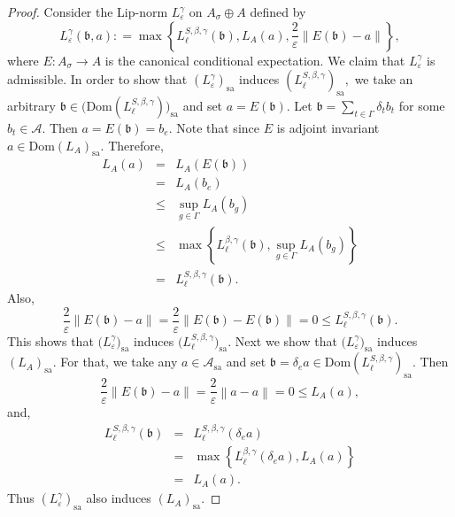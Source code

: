 \documentclass[a4paper,11pt,reqno]{amsart}
\theoremstyle{plain}
\theoremstyle{mainthmstyle}
\theoremstyle{named}
\numberwithin{equation}{section}
\newcommand{\Bea}{\begin{eqnarray*}}
\newcommand{\Eea}{\end{eqnarray*}}
\begin{document}
\begin{proof}
Consider the Lip-norm $L_{\varepsilon}^{\gamma}$ on $A_{\sigma} \oplus A$ defined by 
$$L_{\varepsilon}^{\gamma} (\mathfrak {b}, a) : = \max \left \{L_{\ell}^{S, \beta, \gamma} (\mathfrak {b}), L_A (a), \frac {2} {\varepsilon} \left \|E (\mathfrak {b}) - a \right \| \right \},$$
where $E : A_{\sigma} \rightarrow A$ is the canonical conditional expectation. We claim that $L_{\varepsilon}^{\gamma}$ is admissible. In order to show that $(L_{\varepsilon}^{\gamma})_{\mathrm{sa}}$ induces $(L_{\ell}^{S, \beta, \gamma})_{\mathrm{sa}},$ we take an arbitrary $\mathfrak {b} \in \big(\mathrm{Dom}(L^{S,\beta,\gamma}_{\ell})\big)_{\mathrm{sa}}$ and set $a = E (\mathfrak {b}).$ Let $\mathfrak {b} = \sum\limits_{t \in \Gamma} \delta_t b_t$ for some $b_{t}\in\mathcal A$. Then $a = E (\mathfrak {b}) = b_e.$ Note that since $E$ is adjoint invariant $a \in \mathrm{Dom}(L_A)_\mathrm{sa}.$ Therefore,
\Bea
L_A (a) & = & L_A (E (\mathfrak {b})) \\ & = & L_A \left (b_e \right ) \\ & \leq & \sup\limits_{g \in \Gamma} L_A \left (b_g \right ) \\ & \leq & \max \left \{L_{\ell}^{\beta, \gamma} (\mathfrak {b}), \sup\limits_{g \in \Gamma} L_A \left (b_g \right ) \right \} \\ & = & L_{\ell}^{S, \beta, \gamma} (\mathfrak {b}).
\Eea
Also, $$\frac {2} {\varepsilon} \left \|E (\mathfrak {b}) - a \right \| = \frac {2} {\varepsilon} \left \|E (\mathfrak {b}) - E (\mathfrak {b}) \right \| = 0 \leq L_{\ell}^{S, \beta, \gamma} (\mathfrak {b}).$$
This shows that $\big(L_{\varepsilon}^{\gamma}\big)_{\mathrm{sa}}$ induces $\big(L_{\ell}^{S, \beta, \gamma}\big)_{\mathrm{sa}}.$ Next we show that $\big(L_{\varepsilon}^{\gamma}\big)_{\mathrm{sa}}$ induces $(L_A)_{\mathrm{sa}}.$
For that, we take any $a \in \mathcal {A}_{\mathrm {sa}}$ and set $\mathfrak {b} = \delta_e a \in  \mathrm{Dom}(L^{S,\beta,\gamma}_{\ell})_{\mathrm {sa}}.$ Then 
$$\frac {2} {\varepsilon} \left \|E (\mathfrak {b}) - a \right \| = \frac {2} {\varepsilon} \left \|a - a \right \| = 0 \leq L_A (a),$$ and,
\Bea
L_{\ell}^{S, \beta, \gamma} (\mathfrak {b}) & = & L_{\ell}^{S, \beta, \gamma} \left (\delta_e a \right ) \\ & = & \max \left \{L_{\ell}^{\beta, \gamma} \left (\delta_e a \right ), L_A (a) \right \} \\ & = & L_A (a).
\Eea
Thus $(L_{\varepsilon}^{\gamma})_{\mathrm{sa}}$ also induces $(L_A)_{\mathrm{sa}}.$


\end{proof}
\end{document}

